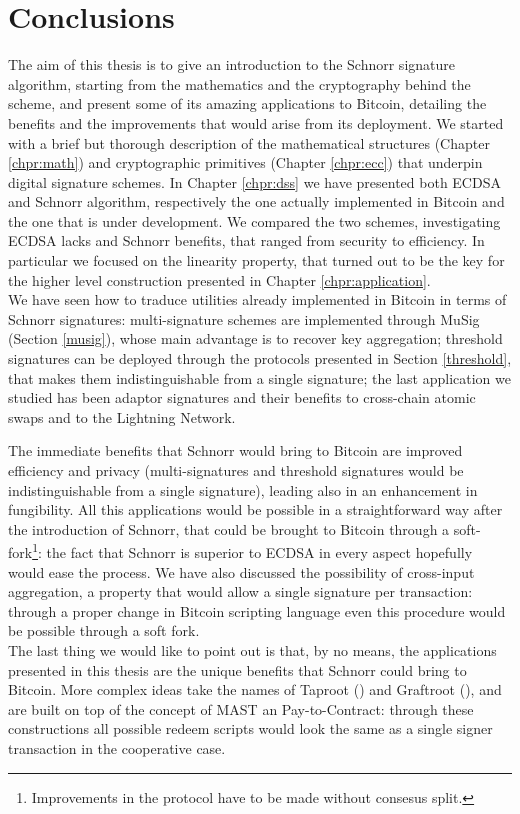 \chapter{Conclusions}
\label{chpr:conclusion}
The aim of this thesis is to give an introduction to the Schnorr signature algorithm, starting from the mathematics and the cryptography behind the scheme, and present some of its amazing applications to Bitcoin, detailing the benefits and the improvements that would arise from its deployment. We started with a brief but thorough description of the mathematical structures (Chapter \ref{chpr:math}) and cryptographic primitives (Chapter \ref{chpr:ecc}) that underpin digital signature schemes. In Chapter \ref{chpr:dss} we have presented both ECDSA and Schnorr algorithm, respectively the one actually implemented in Bitcoin and the one that is under development. We compared the two schemes, investigating ECDSA lacks and Schnorr benefits, that ranged from security to efficiency. In particular we focused on the linearity property, that turned out to be the key for the higher level construction presented in Chapter \ref{chpr:application}.
\\
We have seen how to traduce utilities already implemented in Bitcoin in terms of Schnorr signatures: multi-signature schemes are implemented through MuSig (Section \ref{musig}), whose main advantage is to recover key aggregation; threshold signatures can be deployed through the protocols presented in Section \ref{threshold}, that makes them indistinguishable from a single signature; the last application we studied has been adaptor signatures and their benefits to cross-chain atomic swaps and to the Lightning Network.

\bigskip
\noindent
The immediate benefits that Schnorr would bring to Bitcoin are improved efficiency and privacy (multi-signatures and threshold signatures would be indistinguishable from a single signature), leading also in an enhancement in fungibility. All this applications would be possible in a straightforward way after the introduction of Schnorr, that could be brought to Bitcoin through a soft-fork\footnote{Improvements in the protocol have to be made without consesus split.}: the fact that Schnorr is superior to ECDSA in every aspect hopefully would ease the process. We have also discussed the possibility of cross-input aggregation, a property that would allow a single signature per transaction: through a proper change in Bitcoin scripting language even this procedure would be possible through a soft fork.
\\
The last thing we would like to point out is that, by no means, the applications presented in this thesis are the unique benefits that Schnorr could bring to Bitcoin. More complex ideas take the names of Taproot (\cite{Taproot}) and Graftroot (\cite{Graftroot}), and are built on top of the concept of MAST an Pay-to-Contract: through these constructions all possible redeem scripts would look the same as a single signer transaction in the cooperative case.